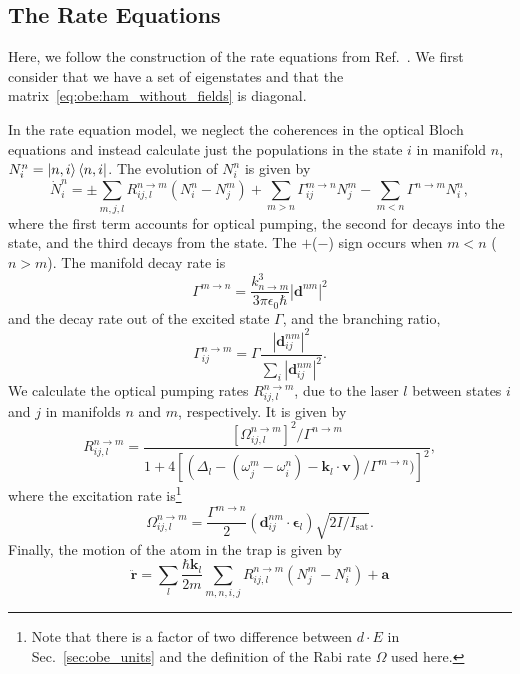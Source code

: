 \documentclass[final,5p,times,twocolumn]{elsarticle}
\begin{document}
\subsection{The Rate Equations}
Here, we follow the construction of the rate equations from Ref.~\cite{Tarbutt2015}.  We first consider that we have a set of
eigenstates and that the matrix~\ref{eq:obe:ham_without_fields} is diagonal. 

In the rate equation model, we neglect the coherences in the optical Bloch equations and instead calculate just the populations in the state $i$ in manifold $n$, $N^n_i = \ket{n, i}\bra{n, i}$.  The evolution of $N^n_i$ is given by
\begin{equation}
    \dot{N}^n_i = \pm\sum_{m,j,l} R^{n\rightarrow m}_{ij,l} (N^n_i - N^m_j) + \sum_{m>n
    } \Gamma^{m\rightarrow n}_{ij} N^m_j - \sum_{m<n}\Gamma^{n\rightarrow m} N^n_i,
\end{equation}
where the first term accounts for optical pumping, the second for decays into the state, and the third decays from the state.  The $+$($-$) sign occurs when $m<n$ ($n>m$).  The manifold decay rate is 
\begin{equation}
	\Gamma^{m\rightarrow n} = \frac{k^3_{n\rightarrow m}}{3\pi\epsilon_0\hbar}|\mathbf{d}^{nm}|^2
\end{equation}
and the decay rate out of the excited state $\Gamma$, and the branching ratio,
\begin{equation}
    \Gamma_{ij}^{n\rightarrow m} = \Gamma \frac{\left|\mathbf{d}^{nm}_{ij}\right|^2}{\sum_i \left|\mathbf{d}^{nm}_{ij}\right|^2}.
\end{equation}
We calculate the optical pumping rates $R_{ij, l}^{n\rightarrow m}$, due to the laser $l$ between states $i$ and $j$ in manifolds $n$ and $m$, respectively.  It is given by
\begin{equation}
    \label{eq:rate_eq:pumping_rate}
    R_{ij,l}^{n\rightarrow m} = \frac{[\Omega^{n\rightarrow m}_{ij,l}]^2/\Gamma^{n\rightarrow m}}{1 + 4[(\Delta_l - (\omega^m_j-\omega^n_i) - \mathbf{k}_l\cdot \mathbf{v})/\Gamma^{m\rightarrow n})]^2},
\end{equation}
where the excitation rate is\footnote{Note that there is a factor of two difference between $d\cdot E$ in Sec.~\ref{sec:obe_units} and the definition of the Rabi rate $\Omega$ used here.}
\begin{equation}
	\label{eq:rabi_rate_rate_eq}
	\Omega_{ij,l}^{n\rightarrow m} = \frac{\Gamma^{m\rightarrow n}}{2} (\mathbf{d}_{ij}^{nm}\cdot \boldsymbol{\epsilon}_l) \sqrt{2I/I_\text{sat}}.
\end{equation}
Finally, the motion of the atom in the trap is given by
\begin{equation}
	\mathbf{\ddot{r}} = \sum_{l} \frac{\hbar \mathbf{k}_l}{2m}\sum_{m, n, i,j} R_{ij,l}^{n\rightarrow m}(N^m_j - N^n_i) + \mathbf{a}
\end{equation}
\end{document}
